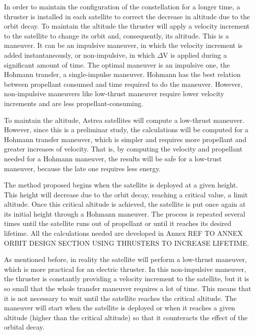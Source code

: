 In order to maintain the configuration of the constellation for a longer time, a thruster is installed in each satellite to correct the decrease in altitude due to the orbit decay. To maintain the altitude the thruster will apply a velocity increment to the satellite to change its orbit and, consequently, its altitude. This is a maneuver. It can be an impulsive maneuver, in which the velocity increment is added instantaneously, or non-impulsive, in which $\Delta$V is applied during a significant amount of time. The optimal maneuver is an impulsive one, the Hohmann transfer, a single-impulse maneuver. Hohmann has the best relation between propellant consumed and time required to do the maneuver. However, non-impulsive maneuvers like low-thrust maneuver require lower velocity increments and are less propellant-consuming.

To maintain the altitude, Astrea satellites will compute a low-thrust maneuver. However, since this is a preliminar study, the calculations will be computed for a Hohmann transfer maneuver, which is simpler and requires more propellant and greater increases of velocity. That is, by computing the velocity and propellant needed for a Hohmann maneuver, the results will be safe for a low-trust maneuver, because the late one requires less energy.

The method proposed begins when the satellite is deployed at a given height. This height will decrease due to the orbit decay, reaching a critical value, a limit altitude. Once this critical altitude is achieved, the satellite is put once again at its initial height through a Hohmann maneuver. The process is repeated several times until the satellite runs out of propellant or until it reaches its desired lifetime. All the calculations needed are developed in Annex REF TO ANNEX ORBIT DESIGN SECTION USING THRUSTERS TO INCREASE LIFETIME.

As mentioned before, in reality the satellite will perform a low-thrust maneuver, which is more practical for an electric thruster. In this non-impulsive maneuver, the thruster is constantly providing a velocity increment to the satellite, but it is so small that the whole transfer maneuver requires a lot of time. This means that it is not necessary to wait until the satellite reaches the critical altitude. The maneuver will start when the satellite is deployed or when it reaches a given altitude (higher than the critical altitude) so that it counteracts the effect of the orbital decay.

